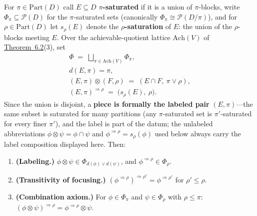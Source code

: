 \begin{thmplain}

For \(\pi \in \mathrm{Part}(D)\) call \(E \subseteq D\) \textbf{\(\pi\)-saturated} if it is a union of \(\pi\)-blocks, write \(\Phi_\pi \subseteq \mathcal{P}(D)\) for the \(\pi\)-saturated sets (canonically \(\Phi_\pi \cong \mathcal{P}(D/\pi)\)), and for \(\rho \in \mathrm{Part}(D)\) let \(s_\rho(E)\) denote the \textbf{\(\rho\)-saturation} of \(E\): the union of the \(\rho\)-blocks meeting \(E\). Over the achievable-quotient lattice \(\mathrm{Ach}(V)\) of \hyperlink{stmt:6.2}{Theorem~6.2}(3), set
\[\begin{gathered}\Phi \;=\; \bigsqcup_{\pi \in \mathrm{Ach}(V)} \Phi_\pi, \\ d(E, \pi) = \pi, \\ (E, \pi) \otimes (F, \rho) \;=\; (E \cap F,\ \pi \vee \rho), \\ (E, \pi)^{\Rightarrow \rho} \;=\; \big(s_\rho(E),\ \rho\big).\end{gathered}\]
Since the union is disjoint, a \textbf{piece is formally the labeled pair} \((E, \pi)\)---\hspace{0pt}the same subset is saturated for many partitions (any \(\pi\)-saturated set is \(\pi'\)-saturated for every finer \(\pi'\)), and the label is part of the datum; the unlabeled abbreviations \(\phi \otimes \psi = \phi \cap \psi\) and \(\phi^{\Rightarrow\rho} = s_\rho(\phi)\) used below always carry the label composition displayed here.
Then:

\begin{enumerate}
\def\labelenumi{\arabic{enumi}.}
\tightlist
\item
  \textbf{(Labeling.)} \(\phi \otimes \psi \in \Phi_{d(\phi) \vee d(\psi)}\), and \(\phi^{\Rightarrow\rho} \in \Phi_\rho\).
\item
  \textbf{(Transitivity of focusing.)} \((\phi^{\Rightarrow\rho})^{\Rightarrow\rho'} = \phi^{\Rightarrow\rho'}\) for \(\rho' \le \rho\).
\item
  \textbf{(Combination axiom.)} For \(\phi \in \Phi_\pi\) and \(\psi \in \Phi_\rho\) with \(\rho \le \pi\): \((\phi \otimes \psi)^{\Rightarrow \rho} = \phi^{\Rightarrow\rho} \otimes \psi\).
\end{enumerate}


\end{thmplain}
